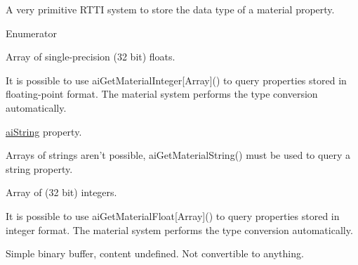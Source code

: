 A very primitive R\+T\+T\+I system to store the data type of a material property. \begin{Desc}
\item[Enumerator]\par
\begin{description}
\item[{\em 
\hypertarget{namespaceassimp_1_1material_a9c77cffdda8a7bb8e6f97ff5e490702aaac72950dac730999f7bf4b9105eea1f8}{Float}\label{namespaceassimp_1_1material_a9c77cffdda8a7bb8e6f97ff5e490702aaac72950dac730999f7bf4b9105eea1f8}
}]Array of single-\/precision (32 bit) floats.

It is possible to use {\ttfamily ai\+Get\+Material\+Integer\mbox{[}Array\mbox{]}()} to query properties stored in floating-\/point format. The material system performs the type conversion automatically. \item[{\em 
\hypertarget{namespaceassimp_1_1material_a9c77cffdda8a7bb8e6f97ff5e490702aae502a136ec8dd5e9a1553d66e38be8b7}{String}\label{namespaceassimp_1_1material_a9c77cffdda8a7bb8e6f97ff5e490702aae502a136ec8dd5e9a1553d66e38be8b7}
}]\hyperlink{structai_string}{ai\+String} property.

Arrays of strings aren't possible, {\ttfamily ai\+Get\+Material\+String()} must be used to query a string property. \item[{\em 
\hypertarget{namespaceassimp_1_1material_a9c77cffdda8a7bb8e6f97ff5e490702aa3c09b591dd4a00f5ced8177bb235de6f}{Integer}\label{namespaceassimp_1_1material_a9c77cffdda8a7bb8e6f97ff5e490702aa3c09b591dd4a00f5ced8177bb235de6f}
}]Array of (32 bit) integers.

It is possible to use {\ttfamily ai\+Get\+Material\+Float\mbox{[}Array\mbox{]}()} to query properties stored in integer format. The material system performs the type conversion automatically. \item[{\em 
\hypertarget{namespaceassimp_1_1material_a9c77cffdda8a7bb8e6f97ff5e490702aa3ae6c3b2dd91e5161f86bc3c51590b35}{Buffer}\label{namespaceassimp_1_1material_a9c77cffdda8a7bb8e6f97ff5e490702aa3ae6c3b2dd91e5161f86bc3c51590b35}
}]Simple binary buffer, content undefined. Not convertible to anything. \end{description}
\end{Desc}
